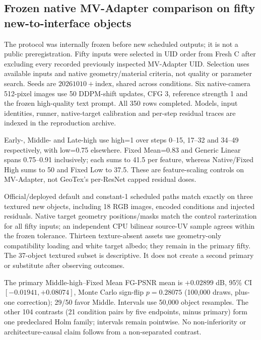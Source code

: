 \documentclass[11pt]{article}
\begin{document}
\subsection*{Frozen native MV-Adapter comparison on fifty new-to-interface objects}
The protocol was internally frozen before new scheduled outputs; it is not a public preregistration. Fifty inputs were selected in UID order from Fresh C after excluding every recorded previously inspected MV-Adapter UID. Selection uses available inputs and native geometry/material criteria, not quality or parameter search. Seeds are $20261010+\mathrm{index}$, shared across conditions. Six native-camera 512-pixel images use 50 DDPM-shift updates, CFG 3, reference strength 1 and the frozen high-quality text prompt. All 350 rows completed. Models, input identities, runner, native-target calibration and per-step residual traces are indexed in the reproduction archive.

Early-, Middle- and Late-high use high=1 over steps 0--15, 17--32 and 34--49 respectively, with low=0.75 elsewhere. Fixed Mean=0.83 and Generic Linear spans 0.75--0.91 inclusively; each sums to 41.5 per feature, whereas Native/Fixed High sums to 50 and Fixed Low to 37.5. These are feature-scaling controls on MV-Adapter, not GeoTex's per-ResNet capped residual doses.

Official/deployed default and constant-1 scheduled paths match exactly on three textured new objects, including 18 RGB images, encoded conditions and injected residuals. Native target geometry positions/masks match the control rasterization for all fifty inputs; an independent CPU bilinear source-UV sample agrees within the frozen tolerance. Thirteen texture-absent assets use geometry-only compatibility loading and white target albedo; they remain in the primary fifty. The 37-object textured subset is descriptive. It does not create a second primary or substitute after observing outcomes.

The primary Middle-high--Fixed Mean FG-PSNR mean is $+0.02899$ dB, 95\% CI $[-0.01941,+0.08074]$, Monte Carlo sign-flip $p=0.28075$ (100,000 draws, plus-one correction); 29/50 favor Middle. Intervals use 50,000 object resamples. The other 104 contrasts (21 condition pairs by five endpoints, minus primary) form one predeclared Holm family; intervals remain pointwise. No non-inferiority or architecture-causal claim follows from a non-separated contrast.
\end{document}
